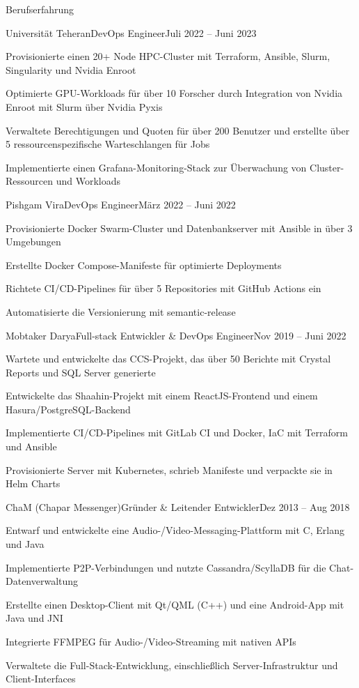 \documentclass[]{main}
\begin{document}
\begin{section}{Berufserfahrung}
 \begin{subsection}{Universität Teheran}{DevOps Engineer}{Juli 2022 -- Juni 2023}{}
     \item Provisionierte einen 20+ Node HPC-Cluster mit Terraform, Ansible, Slurm, Singularity und Nvidia Enroot
     \item Optimierte GPU-Workloads für über 10 Forscher durch Integration von Nvidia Enroot mit Slurm über Nvidia Pyxis
     \item Verwaltete Berechtigungen und Quoten für über 200 Benutzer und erstellte über 5 ressourcenspezifische Warteschlangen für Jobs
     \item Implementierte einen Grafana-Monitoring-Stack zur Überwachung von Cluster-Ressourcen und Workloads
 \end{subsection}

 \begin{subsection}{Pishgam Vira}{DevOps Engineer}{März 2022 -- Juni 2022}{}
     \item Provisionierte Docker Swarm-Cluster und Datenbankserver mit Ansible in über 3 Umgebungen
     \item Erstellte Docker Compose-Manifeste für optimierte Deployments
     \item Richtete CI/CD-Pipelines für über 5 Repositories mit GitHub Actions ein
     \item Automatisierte die Versionierung mit semantic-release
 \end{subsection}

 \begin{subsection}{Mobtaker Darya}{Full-stack Entwickler \& DevOps Engineer}{Nov 2019 -- Juni 2022}{}
     \item Wartete und entwickelte das CCS-Projekt, das über 50 Berichte mit Crystal Reports und SQL Server generierte
     \item Entwickelte das Shaahin-Projekt mit einem ReactJS-Frontend und einem Hasura/PostgreSQL-Backend
     \item Implementierte CI/CD-Pipelines mit GitLab CI und Docker, IaC mit Terraform und Ansible
     \item Provisionierte Server mit Kubernetes, schrieb Manifeste und verpackte sie in Helm Charts
 \end{subsection}

 \begin{subsection}{ChaM (Chapar Messenger)}{Gründer \& Leitender Entwickler}{Dez 2013 -- Aug 2018}{}
     \item Entwarf und entwickelte eine Audio-/Video-Messaging-Plattform mit C, Erlang und Java
     \item Implementierte P2P-Verbindungen und nutzte Cassandra/ScyllaDB für die Chat-Datenverwaltung
     \item Erstellte einen Desktop-Client mit Qt/QML (C++) und eine Android-App mit Java und JNI
     \item Integrierte FFMPEG für Audio-/Video-Streaming mit nativen APIs
     \item Verwaltete die Full-Stack-Entwicklung, einschließlich Server-Infrastruktur und Client-Interfaces
 \end{subsection}
\end{section}
\end{document}
